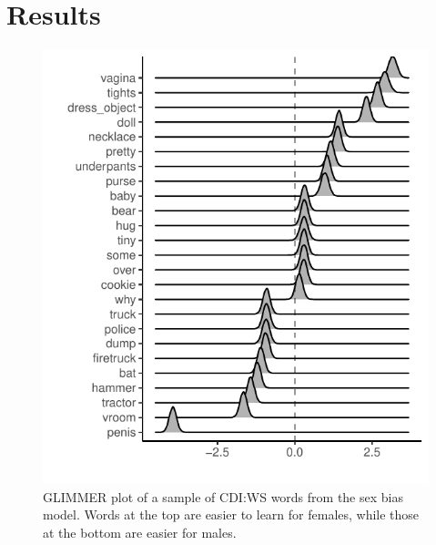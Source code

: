 \documentclass[10pt, letterpaper]{article}
\newenvironment{CodeChunk}{}{}
\begin{document}
\hypertarget{results}{%
\section{Results}\label{results}}

\begin{CodeChunk}
\begin{figure}[H]

{\centering \includegraphics[width=\linewidth]{figs/smGLIMMER_sex_prodWS} 

}

\caption[GLIMMER plot of a sample of CDI:WS words from the sex bias model]{GLIMMER plot of a sample of CDI:WS words from the sex bias model. Words at the top are easier to learn for females, while those at the bottom are easier for males.}\label{fig:sex-glimmer}
\end{figure}
\end{CodeChunk}
\end{document}
